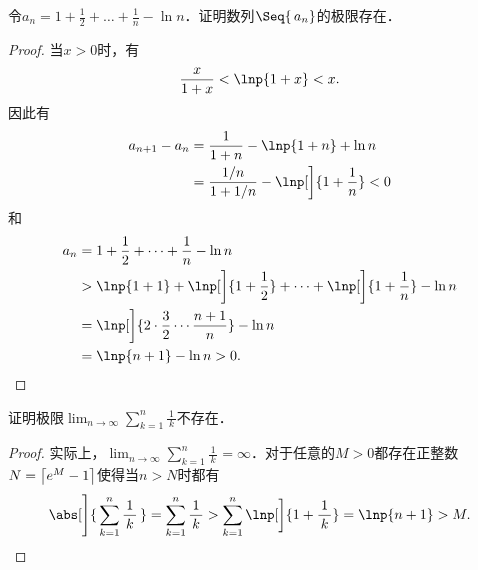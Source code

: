 \begin{example*}
  令\(\displaystyle a_n = 1 + \frac12 + \dots + \frac1n - \ln n\)．证明数列\(\Seq{\,a_n}\)的极限存在．\rule{0ex}{3.5ex}

  \begin{proof}
    当\(x > 0\)时，有
    \begin{equation*}
      \frac{x}{1+x} < \lnp{1+x} < x.
    \end{equation*}
    因此有
    \begin{align*}
      a_{n+1} - a_n
      &= \frac{1}{1+n} - \lnp{1+n} + \ln n \\
      &= \frac{1/n}{1+1/n} - \lnp[\bigg]{1+\frac1n} < 0
    \end{align*}
    和
    \begin{align*}
      a_n
      &= 1 + \frac12 + \dots + \frac1n - \ln n \\
      &> \lnp{1+1} + \lnp[\bigg]{1+\frac12} + \dots + \lnp[\bigg]{1+\frac1n} - \ln n \\
      &= \lnp[\bigg]{2 \cdot \frac32 \dotsm \frac{n+1}{n}} - \ln n \\
      &= \lnp{n + 1} - \ln n > 0. \qedhere
    \end{align*}
  \end{proof}
\end{example*}

\begin{example*}
  证明极限\(\displaystyle \lim_{n\to\infty} \sum_{k=1}^n \frac1{\,k\,}\)不存在．

  \begin{proof}
    实际上，\(\displaystyle \lim_{n\to\infty} \sum_{k=1}^n \frac1{\,k\,} = \infty\)．对于任意的\(M > 0\)都存在正整数\(N = \ceil[\big]{e^M-1}\)使得当\(n > N\)时都有
    \begin{equation*}
      \abs[\Bigg]{\,\sum_{k=1}^n \frac1{\,k\,}\,}
      = \sum_{k=1}^n \frac1{\,k\,}
      > \sum_{k=1}^n \lnp[\bigg]{1+\frac1{\,k\,}}
      = \lnp{n+1} > M.
      \qedhere
    \end{equation*}
  \end{proof}
\end{example*}

